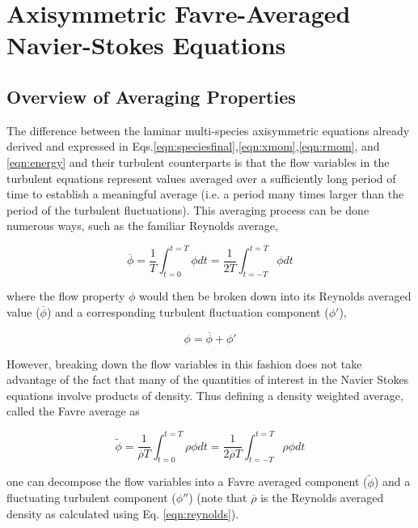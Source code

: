 \section{Axisymmetric Favre-Averaged Navier-Stokes Equations}
\subsection{Overview of Averaging Properties}

	The difference between the laminar multi-species axisymmetric equations already derived and expressed in 
Eqs.\ref{eqn:speciesfinal},\ref{eqn:xmom},\ref{eqn:rmom}, and \ref{eqn:energy} and their turbulent 
counterparts is that the flow variables in the turbulent equations represent values averaged over a 
sufficiently long period of time to establish a meaningful average (i.e. a period many times larger than
the period of the turbulent fluctuations).  This averaging process can be done numerous
ways, such as the familiar Reynolds average,

\begin{equation}
	\overline{\phi} = \frac{1}{T}\int_{t=0}^{t=T} \phi dt = \frac{1}{2T}\int_{t=-T}^{t=T} \phi dt
\label{eqn:reynolds}
\end{equation}

	where the flow property $\phi$ would then be broken down into its Reynolds averaged value ($\overline{\phi}$)
and a corresponding turbulent fluctuation component ($\phi'$),

\begin{equation}
	\phi = \overline{\phi} + \phi'
\label{eqn:reybreakdown}
\end{equation}

	However, breaking down the flow variables in this fashion does not take advantage of the fact
that many of the quantities of interest in the Navier Stokes equations involve products of density.  
Thus defining a density weighted average, called the Favre average as

\begin{equation}
	\tilde{\phi} = \frac{1}{\overline{\rho} T}\int_{t=0}^{t=T} \rho \phi dt = \frac{1}{2\overline{\rho} T}
	\int_{t=-T}^{t=T} \rho \phi dt
\label{eqn:favre}
\end{equation}

	one can decompose the flow variables into a Favre averaged component ($\tilde\phi$) and a fluctuating turbulent
component ($\phi''$) (note that $\overline{\rho}$ is the Reynolds averaged density as calculated using Eq. \ref{eqn:reynolds}).

